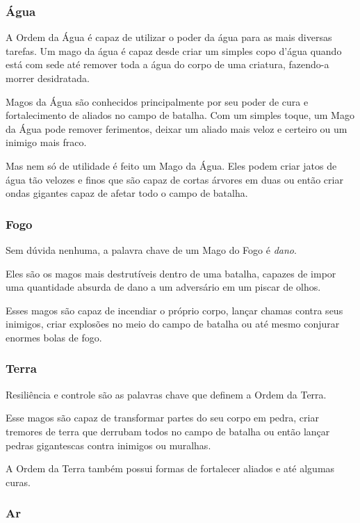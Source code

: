 \documentclass{RPG_Adventure}[2021/10/20]
\begin{document}
\subsubsection{Água}%

A Ordem da Água é capaz de utilizar o poder da água para as mais diversas
tarefas. Um mago da água é capaz desde criar um simples copo d'água quando está
com sede até remover toda a água do corpo de uma criatura, fazendo-a morrer
desidratada.

Magos da Água são conhecidos principalmente por seu poder de cura e
fortalecimento de aliados no campo de batalha. Com um simples toque, um Mago da
Água pode remover ferimentos, deixar um aliado mais veloz e certeiro ou um
inimigo mais fraco.

Mas nem só de utilidade é feito um Mago da Água. Eles podem criar jatos de água
tão velozes e finos que são capaz de cortas árvores em duas ou então criar ondas
gigantes capaz de afetar todo o campo de batalha.

\subsubsection*{Fogo}%

Sem dúvida nenhuma, a palavra chave de um Mago do Fogo é \textit{dano}.

Eles são os magos mais destrutíveis dentro de uma batalha, capazes de impor uma
quantidade absurda de dano a um adversário em um piscar de olhos.

Esses magos são capaz de incendiar o próprio corpo, lançar chamas contra seus
inimigos, criar explosões no meio do campo de batalha ou até mesmo conjurar
enormes bolas de fogo.

\subsubsection*{Terra}%

Resiliência e controle são as palavras chave que definem a Ordem da Terra.

Esse magos são capaz de transformar partes do seu corpo em pedra, criar tremores
de terra que derrubam todos no campo de batalha ou então lançar pedras
gigantescas contra inimigos ou muralhas.

A Ordem da Terra também possui formas de fortalecer aliados e até algumas curas.

\subsubsection*{Ar}%
\end{document}
